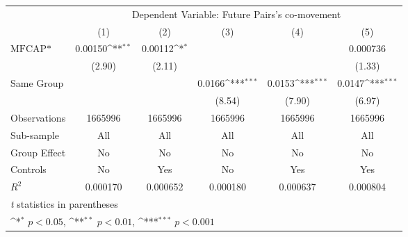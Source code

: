 {
\def\sym#1{\ifmmode^{#1}\else\(^{#1}\)\fi}
\begin{tabular}{l*{5}{c}}
\hline\hline
                &\multicolumn{5}{c}{Dependent Variable: Future Pairs's co-movement}                            \\\cmidrule(lr){2-6}
                &\multicolumn{1}{c}{(1)}         &\multicolumn{1}{c}{(2)}         &\multicolumn{1}{c}{(3)}         &\multicolumn{1}{c}{(4)}         &\multicolumn{1}{c}{(5)}         \\
\hline
$ \text{MFCAP*} $&  0.00150\sym{**} &  0.00112\sym{*}  &                  &                  & 0.000736         \\
                &   (2.90)         &   (2.11)         &                  &                  &   (1.33)         \\
[1em]
Same Group      &                  &                  &   0.0166\sym{***}&   0.0153\sym{***}&   0.0147\sym{***}\\
                &                  &                  &   (8.54)         &   (7.90)         &   (6.97)         \\
\hline
Observations    &  1665996         &  1665996         &  1665996         &  1665996         &  1665996         \\
Sub-sample      &      All         &      All         &      All         &      All         &      All         \\
Group Effect    &       No         &       No         &       No         &       No         &       No         \\
Controls        &       No         &      Yes         &       No         &      Yes         &      Yes         \\
$ R^2 $         & 0.000170         & 0.000652         & 0.000180         & 0.000637         & 0.000804         \\
\hline\hline
\multicolumn{6}{l}{\footnotesize \textit{t} statistics in parentheses}\\
\multicolumn{6}{l}{\footnotesize \sym{*} \(p<0.05\), \sym{**} \(p<0.01\), \sym{***} \(p<0.001\)}\\
\end{tabular}
}
